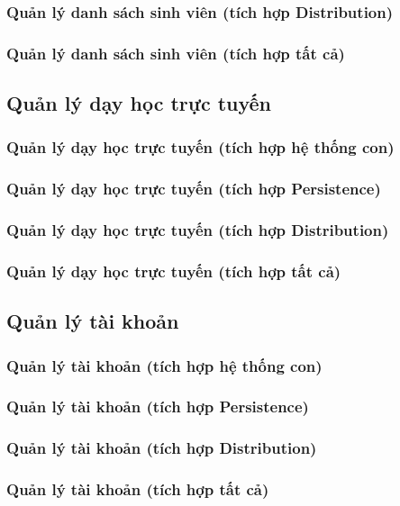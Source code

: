 \documentclass[./../main.tex]{subfiles}
\begin{document}
\subsubsection{Quản lý danh sách sinh viên (tích hợp Distribution)}
\subsubsection{Quản lý danh sách sinh viên (tích hợp tất cả)}

\subsection{Quản lý dạy học trực tuyến}
\subsubsection{Quản lý dạy học trực tuyến (tích hợp hệ thống con)}
\subsubsection{Quản lý dạy học trực tuyến (tích hợp Persistence)}
\subsubsection{Quản lý dạy học trực tuyến (tích hợp Distribution)}
\subsubsection{Quản lý dạy học trực tuyến (tích hợp tất cả)}

\subsection{Quản lý tài khoản}
\subsubsection{Quản lý tài khoản (tích hợp hệ thống con)}
\subsubsection{Quản lý tài khoản (tích hợp Persistence)}
\subsubsection{Quản lý tài khoản (tích hợp Distribution)}
\subsubsection{Quản lý tài khoản (tích hợp tất cả)}
\end{document}
